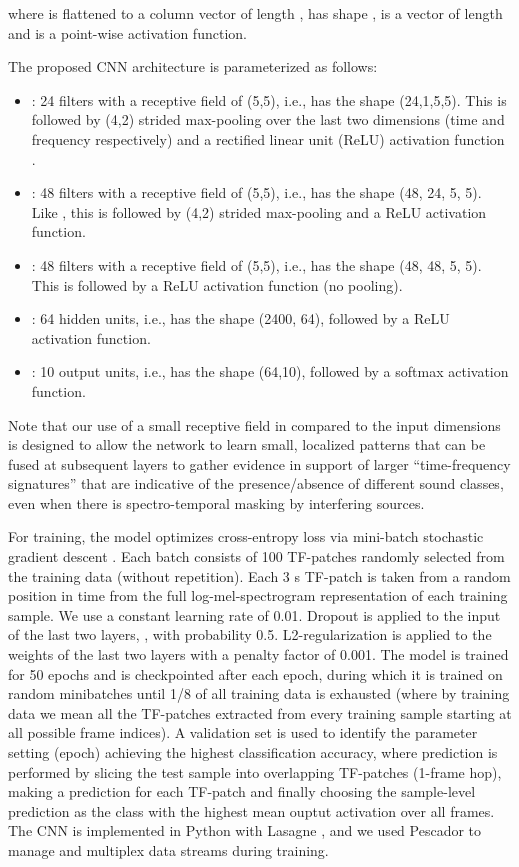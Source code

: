\documentclass[journal,pdf]{IEEEtran}
\begin{document}
where  is flattened to a column vector of length ,  has shape ,  is a vector of length  and  is a point-wise activation function.

The proposed CNN architecture is parameterized as follows:
\begin{itemize}
\item : 24 filters with a receptive field of (5,5), i.e.,  has the shape (24,1,5,5). This is followed by (4,2) strided max-pooling over the last two dimensions (time and frequency respectively) 
and a rectified linear unit (ReLU) activation function .
\item : 48 filters with a receptive field of (5,5), i.e.,  has the shape (48, 24, 5, 5). Like , this is followed by (4,2) strided max-pooling and a ReLU activation function.
\item : 48 filters with a receptive field of (5,5), i.e.,  has the shape (48, 48, 5, 5). This is followed by a ReLU activation function (no pooling).
\item : 64 hidden units, i.e.,  has the shape (2400, 64), followed by a ReLU activation function.
\item : 10 output units, i.e.,  has the shape (64,10), followed by a softmax activation function.
\end{itemize}
Note that our use of a small receptive field  in  compared to the input dimensions  is designed to allow the network to learn small, localized patterns that can be fused at subsequent layers to gather evidence in support of larger ``time-frequency signatures'' that are indicative of the presence/absence of different sound classes, even when there is spectro-temporal masking by interfering sources.

For training, the model optimizes cross-entropy loss via mini-batch stochastic gradient descent \cite{Bottou:SGD:COMPSTAT:10}. Each batch consists of 100 TF-patches randomly selected from the training data (without repetition). Each 3 s TF-patch is taken from a random position in time from the full log-mel-spectrogram representation of each training sample. We use a constant learning rate of 0.01. Dropout \cite{Srivastava:Dropout:JMLR:14} is applied to the input of the last two layers, , with probability 0.5. L2-regularization is applied to the weights of the last two layers with a penalty factor of 0.001. The model is trained for 50 epochs and is checkpointed after each epoch, during which it is trained on random minibatches until 1/8 of all training data is exhausted (where by training data we mean all the TF-patches extracted from every training sample starting at all possible frame indices).
A validation set is used to identify the parameter setting (epoch) achieving the highest classification accuracy, where prediction is performed by slicing the test sample into overlapping TF-patches (1-frame hop), making a prediction for each TF-patch and finally choosing the sample-level prediction as the class with the highest mean ouptut activation over all frames.
The CNN is implemented in Python with Lasagne \cite{Dieleman:Lasagne:ZENODO:15}, and we used Pescador \cite{McFee:Pescador:ZENODO:15} to manage and multiplex data streams during training.
\end{document}
